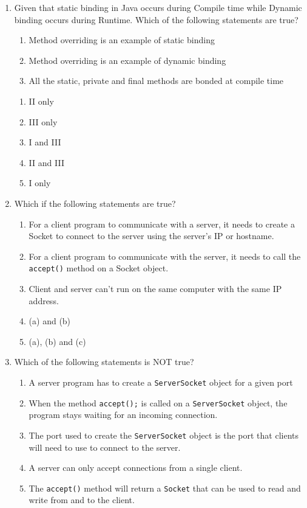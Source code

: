 \documentclass[CS180-S16-FinalExam.tex]{subfiles}
\begin{document}
\begin{enumerate}
\clearpage
\item Given that static binding in Java occurs during Compile time while Dynamic binding occurs during Runtime. Which of the following statements are true?
\begin{enumerate}[I]
\item Method overriding is an example of static binding 
\item Method overriding is an example of dynamic binding 
\item All the static, private and final methods are bonded at compile time
\end{enumerate}
\begin{enumerate}
\item II only
\item III only
\item I and III
\item II and III \ifdraft \Ans \fi
\item I only
\end{enumerate}

\item Which if the following statements are true?
\begin{enumerate}
\item For a client program to communicate with a server, it needs to create a Socket to connect to the server using the server's IP or hostname.
\item For a client program to communicate with the server, it needs to call the \texttt{accept()} method on a Socket object.
\item Client and server can't run on the same computer with the same IP address.
\item (a) and (b) \ifdraft \Ans \fi
\item (a), (b) and (c)
\end{enumerate}

\item Which of the following statements is NOT true?
\begin{enumerate}
\item A server program has to create a \texttt{ServerSocket} object for a given port
\item When the method \texttt{accept();} is called on a \texttt{ServerSocket} object, the program stays waiting for an incoming connection.
\item The port used to create the \texttt{ServerSocket} object is the port that clients will need to use to connect to the server.
\item A server can only accept connections from a single client.  \ifdraft \Ans \fi
\item The \texttt{accept()} method will return a \texttt{Socket} that can be used to read and write from and to the client.
\end{enumerate}


\end{enumerate}
\end{document}
